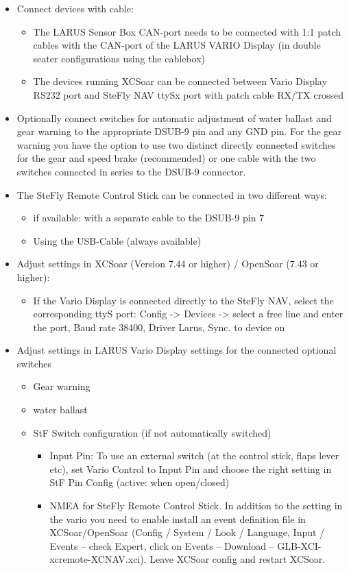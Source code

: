 \begin{itemize}
	\item 	Connect devices with cable:
	\begin{itemize}
		\item 	The LARUS Sensor Box CAN-port needs to be connected with 1:1 patch cables with
				the CAN-port of the LARUS VARIO Display (in double seater configurations using the
				cablebox)
		\item 	The devices running XCSoar can be connected between Vario Display RS232 port and
				SteFly NAV ttySx port with patch cable RX/TX crossed
	\end{itemize}
	\item 	Optionally connect switches for automatic adjustment of water ballast and gear warning to
			the appropriate DSUB-9 pin and any GND pin. For the gear warning you have the option to
			use two distinct directly connected switches for the gear and speed brake (recommended) or
			one cable with the two switches connected in series to the DSUB-9 connector.
	\item 	The SteFly Remote Control Stick can be connected in two different ways:
	\begin{itemize}
		\item 	if available: with a separate cable to the DSUB-9 pin 7
		\item 	Using the USB-Cable (always available)
	\end{itemize}
	\item	Adjust settings in XCSoar (Version 7.44 or higher) / OpenSoar (7.43 or higher):
	\begin{itemize}
		\item 	If the Vario Display is connected directly to the SteFly NAV, select the corresponding
				ttyS port: Config -> Devices -> select a free line and enter the port, Baud rate 38400,
				Driver Larus, Sync. to device on
	\end{itemize}
	\item 	Adjust settings in LARUS Vario Display settings for the connected optional switches
	\begin{itemize}
		\item 	Gear warning
		\item 	water ballast
		\item 	StF Switch configuration (if not automatically switched)
		\begin{itemize}
			\item 	Input Pin: To use an external switch (at the control stick, flaps lever etc), set
					Vario Control to Input Pin and choose the right setting in StF Pin Config
					(active: when open/closed)
			\item 	NMEA for SteFly Remote Control Stick. In addition to the setting in the vario
					you need to enable install an event definition file in XCSoar/OpenSoar
					(Config / System / Look / Language, Input / Events – check Expert, click on
					Events – Download – GLB-XCI-xcremote-XCNAV.xci). Leave XCSoar config and
					restart XCSoar.
		\end{itemize}
	\end{itemize}
\end{itemize}


